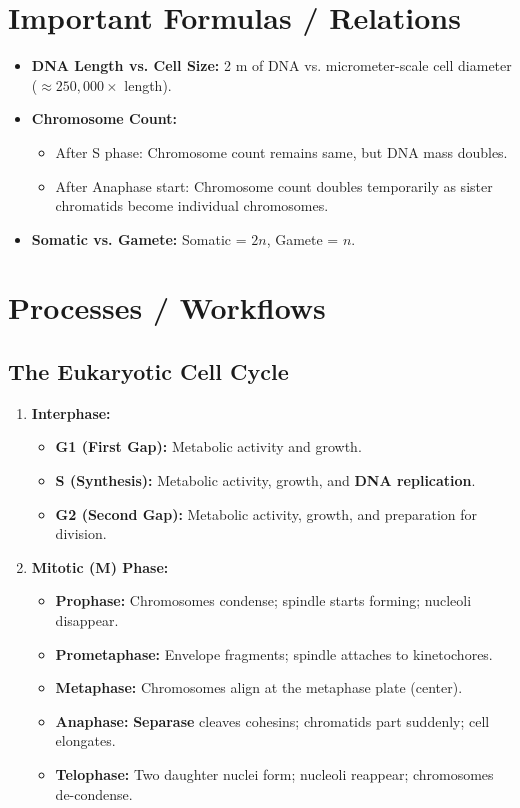 \documentclass[11pt, a4paper]{article}
\begin{document}
\section*{Important Formulas / Relations}
\begin{itemize}
    \item \textbf{DNA Length vs. Cell Size:} 2 m of DNA vs. micrometer-scale cell diameter ($\approx 250,000\times$ length).
    \item \textbf{Chromosome Count:} 
    \begin{itemize}
        \item After S phase: Chromosome count remains same, but DNA mass doubles.
        \item After Anaphase start: Chromosome count doubles temporarily as sister chromatids become individual chromosomes.
    \end{itemize}
    \item \textbf{Somatic vs. Gamete:} Somatic = $2n$, Gamete = $n$.
\end{itemize}

\section*{Processes / Workflows}

\subsection*{The Eukaryotic Cell Cycle}
\begin{enumerate}
    \item \textbf{Interphase:}
    \begin{itemize}
        \item \textbf{G1 (First Gap):} Metabolic activity and growth.
        \item \textbf{S (Synthesis):} Metabolic activity, growth, and \textbf{DNA replication}.
        \item \textbf{G2 (Second Gap):} Metabolic activity, growth, and preparation for division.
    \end{itemize}
    \item \textbf{Mitotic (M) Phase:}
    \begin{itemize}
        \item \textbf{Prophase:} Chromosomes condense; spindle starts forming; nucleoli disappear.
        \item \textbf{Prometaphase:} Envelope fragments; spindle attaches to kinetochores.
        \item \textbf{Metaphase:} Chromosomes align at the metaphase plate (center).
        \item \textbf{Anaphase:} \textbf{Separase} cleaves cohesins; chromatids part suddenly; cell elongates.
        \item \textbf{Telophase:} Two daughter nuclei form; nucleoli reappear; chromosomes de-condense.
    \end{itemize}
\end{enumerate}
\end{document}
